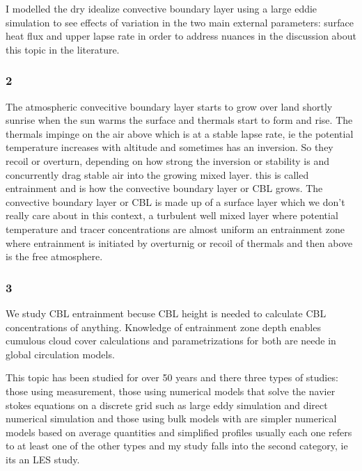 \documentclass{beamer}
\newcommand\FrameText[1]{
\begin{textblock}{16}(1,2.5)
\raggedright #1
\end{textblock}}
\begin{document}

\begin{frame}
I modelled the dry idealize convective boundary layer using a large eddie simulation to see effects of variation in the two main external parameters: surface heat flux and upper lapse rate in order to address nuances in the discussion about this topic in the literature. 
\end{frame}

\begin{frame}
\frametitle{2}
The atmospheric convecitive boundary layer starts to grow over land shortly sunrise when the sun warms the surface and thermals start to form and rise.  The thermals impinge on the air above which is at a stable lapse rate, ie the potential temperature increases with altitude and sometimes has an inversion.  So they recoil or overturn, depending on how strong the inversion or stability is and concurrently drag stable air into the growing mixed layer.  this is called entrainment and is how the convective boundary layer or CBL grows.  The convective boundary layer or CBL is made up of a surface layer which we don't really care about in this context, a turbulent well mixed layer where potential temperature and tracer concentrations are almost uniform an entrainment zone where entrainment is initiated by overturnig or recoil of thermals and then above is the free atmosphere.\\

\end{frame}


\begin{frame}
\frametitle{3}
We study CBL entrainment becuse CBL height is needed to calculate CBL concentrations of anything.  Knowledge of entrainment zone depth enables cumulous cloud cover calculations and parametrizations for both are neede in global circulation models.\\
\end{frame}

\begin{frame}
This topic has been studied for over 50 years and there three types of studies:  those using measurement, those using numerical models that solve the navier stokes equations on a discrete grid such as large eddy simulation and direct numerical simulation and those using bulk models with are simpler numerical models based on average quantities and simplified profiles usually each one refers to at least one of the other types and my study falls into the second category, ie its an LES study.
\end{frame}
\end{document}
